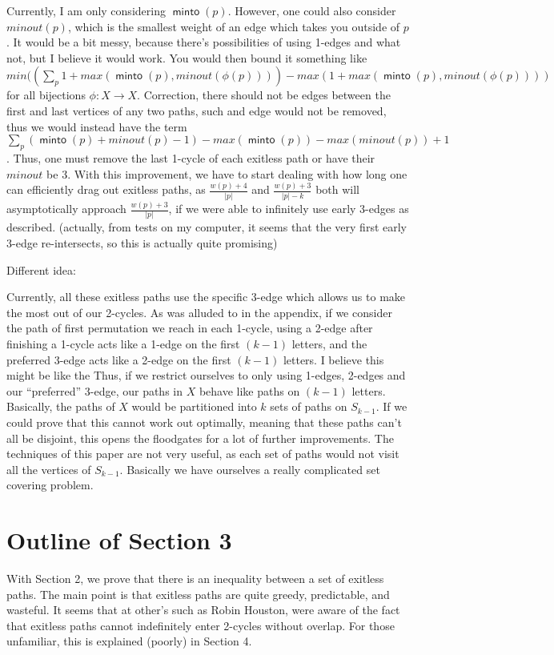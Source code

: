 \documentclass{article}
\DeclareMathOperator{\minto}{\bm{\mathsf{minto}}}
\begin{document}
{Currently, I am only considering $\minto(p)$. However, one could also consider $minout(p)$, which is the smallest weight of an edge which takes you outside of $p$. It would be a bit messy, because there's possibilities of using 1-edges and what not, but I believe it would work. You would then bound it something like $min( \left(\sum_p 1+max( \minto(p), minout(\phi(p))) \right) - max( 1+max(\minto(p),minout(\phi(p))) )$ for all bijections $\phi: X \to X$. Correction, there should not be edges between the first and last vertices of any two paths, such and edge would not be removed, thus we would instead have the term $\sum_p (\minto(p) + minout(p) -1) - max(\minto(p))-max(minout(p))+1$. Thus, one must remove the last 1-cycle of each exitless path or have their $minout$ be 3. With this improvement, we have to start dealing with how long one can efficiently drag out exitless paths, as $\frac{w(p) + 4}{|p|}$ and $\frac{w(p)+3}{|p|-k}$ both will asymptotically approach $\frac{w(p) + 3}{|p|}$, if we were able to infinitely use early 3-edges as described. (actually, from tests on my computer, it seems that the very first early 3-edge re-intersects, so this is actually quite promising)


Different idea:

Currently, all these exitless paths use the specific 3-edge which allows us to make the most out of our 2-cycles. As was alluded to in the appendix, if we consider the path of first permutation we reach in each 1-cycle, using a 2-edge after finishing a 1-cycle acts like a 1-edge on the first $(k-1)$ letters, and the preferred 3-edge acts like a 2-edge on the first $(k-1)$ letters. I believe this might be like the  Thus, if we restrict ourselves to only using 1-edges, 2-edges and our ``preferred'' 3-edge, our paths in $X$ behave like paths on $(k-1)$ letters. Basically, the paths of $X$ would be partitioned into $k$ sets of paths on $S_{k-1}$. If we could prove that this cannot work out optimally, meaning that these paths can't all be disjoint, this opens the floodgates for a lot of further improvements. The techniques of this paper are not very useful, as each set of paths would not visit all the vertices of $S_{k-1}$. Basically we have ourselves a really complicated set covering problem.

\section{Outline of Section 3}

With Section 2, we prove that there is an inequality between a set of exitless paths. The main point is that exitless paths are quite greedy, predictable, and wasteful. It seems that at other's such as Robin Houston, were aware of the fact that exitless paths cannot indefinitely enter 2-cycles without overlap. For those unfamiliar, this is explained (poorly) in Section 4.

}
\end{document}
